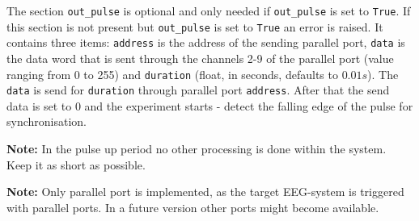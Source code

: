 \documentclass[12pt,a4paper]{book}
\begin{document}
The section \verb|out_pulse| is optional and only needed if \verb|out_pulse| is set to \verb|True|. If this section is not present but \verb|out_pulse| is set to \verb|True| an error is raised. It contains three items: \verb|address| is the address of the sending parallel port, \verb|data| is the data word that is sent through the channels 2-9 of the parallel port (value ranging from 0 to 255) and \verb|duration| (float, in seconds, defaults to $0.01 s$). The \verb|data| is send for \verb|duration| through parallel port \verb|address|. After that the send data is set to $0$ and the experiment starts - detect the falling edge of the pulse for synchronisation.

\textbf{Note:} In the pulse up period no other processing is done within the system. Keep it as short as possible.

\textbf{Note:} Only parallel port is implemented, as the target EEG-system is triggered with parallel ports. In a future version other ports might become available.
\end{document}
